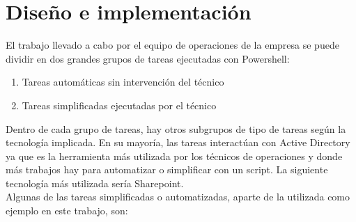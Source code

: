 \documentclass[a4paper, 12pt]{book}
\begin{document}

\cleardoublepage
\chapter{Diseño e implementación}
\label{sec:diseno}

El trabajo llevado a cabo por el equipo de operaciones de la empresa se puede dividir en dos grandes grupos de tareas ejecutadas con Powershell:

\begin{enumerate}

\item Tareas automáticas sin intervención del técnico

\item Tareas simplificadas ejecutadas por el técnico
\end{enumerate}

Dentro de cada grupo de tareas, hay otros subgrupos de tipo de tareas según la tecnología implicada. En su mayoría, las tareas interactúan con Active Directory ya que es la herramienta más utilizada por los técnicos de operaciones y donde más trabajos hay para automatizar o simplificar con un script. La siguiente tecnología más utilizada sería Sharepoint.
\\

Algunas de las tareas simplificadas o automatizadas, aparte de la utilizada como ejemplo en este trabajo, son:
\end{document}
